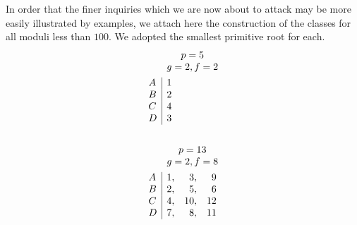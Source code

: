 \documentclass{book}
\theoremstyle{plain}
\theoremstyle{remark}
\begin{document}
In order that the finer inquiries which we are now about to attack may be more easily illustrated by examples, we attach here the construction of the classes for all moduli less than $100$.  We adopted the smallest primitive root for each.
\begin{align*}
& \begin{array}{c} p=5 \\  g=2, f=2 \end{array} \\
\begin{array}{l} A \\ B \\ C \\D \end{array} & \begin{array}{|r} 1 \\ 2 \\ 4 \\ 3 \end{array} \\
\hspace{1mm} \\
& \begin{array}{c} p=13 \\  g=2, f=8 \end{array} \\ 
\begin{array}{l} A \\ B \\ C \\D \end{array} & \begin{array}{|rrr} 1,& 3,& 9 \\ 2,& 5,&6 \\ 4,& 10,& 12 \\ 7,& 8,& 11 \end{array}
\end{align*} 
\end{document}
